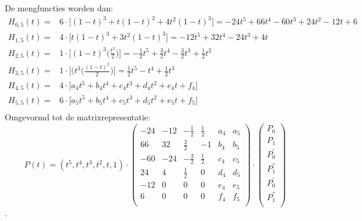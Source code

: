\documentclass{report}
\begin{document}
\begin{itemize}
		De mengfuncties worden dan:
		\begin{equation*}
			\begin{split}
				H_{0, 5}(t) = & 6 \cdot \bigg[(1-t)^3 + t(1-t)^3 + 4t^2(1-t)^3\bigg] = -24t^5 + 66t^4 -60t^3 + 24t^2 -12t + 6\\
				H_{1, 5}(t) = & 4 \cdot \bigg[t(1-t)^3 + 3t^2(1-t)^3\bigg] = -12t^5 +32t^4 -24t^3 + 4t\\
				H_{2, 5}(t) = & 1 \cdot \bigg[(1 - t)^3\bigg(\frac{t^2}{2}\bigg)\bigg] = -\frac{1}{2}  t^5 + \frac{3}{2}  t^4  - \frac{3}{2}t^3 + \frac{1}{2}t^2\\
				H_{3, 5}(t) = & 1 \cdot \bigg[(t^3\bigg(\frac{(1-t)^2}{2}\bigg)\bigg] = \frac{1}{2}t^5 - t^4 + \frac{1}{2}t^3\\
				H_{4, 5}(t) = & 4 \cdot \bigg[a_4t^5 + b_4t^4 + c_4t^3 + d_4t^2 + e_4t + f_4 \bigg]  \\
				H_{5, 5}(t) = & 6 \cdot \bigg[a_5t^5 + b_5t^4 + c_5t^3 + d_5t^2 + e_5t + f_5 \bigg]  \\
			\end{split}
		\end{equation*}
		Omgevormd tot de matrixrepresentatie:
		$$
		P(t) = (t^5, t^4, t^3, t^2, t, 1) 
		\cdot
		\begin{pmatrix}
			-24 & -12 & - \frac{1}{2}  & \frac{1}{2} & a_4 & a_5 \\
			66  & 32  & \frac{3}{2}    & -1 		 & b_4 & b_5 \\
			-60 & -24 & - \frac{3}{2}  & \frac{1}{2} & c_4 & c_5 \\
			24  & 4   &  \frac{1}{2}   & 0 			 & d_4 & d_5 \\
			-12 & 0   & 0  			   & 0 			 & e_4 & e_5 \\
			6   & 0   & 0  			   & 0 			 & f_4 & f_5 \\
		\end{pmatrix}
		\cdot 
		\begin{pmatrix}
			P_0 \\
			P_1 \\
			P_0^{'} \\
			P_1^{''} \\
			P_0^{'} \\
			P_1^{''} \\

		\end{pmatrix}
		$$
		.



			
\end{itemize}
\end{document}
